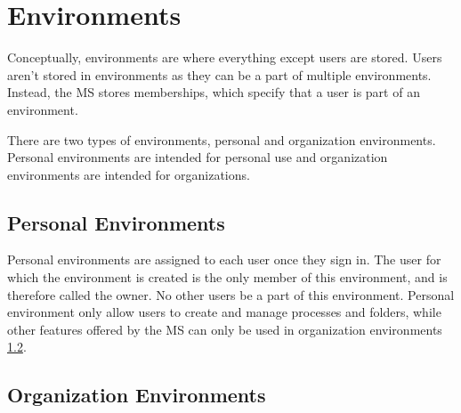 





\section{Environments}
\label{cha:conceptanddesign:environments}

Conceptually, environments are where everything except users are stored.
Users aren't stored in environments as they can be a part of multiple environments.
Instead, the MS stores memberships, which specify that a user is part of an environment.

There are two types of environments, personal and organization environments.
Personal environments are intended for personal use and organization environments are intended
for organizations.

\subsection{Personal Environments}
\label{cha:conceptanddesign:environments:personal}

Personal environments are assigned to each user once they sign in. 
The user for which the environment is created is the only member of this
environment, and is therefore called the owner.
No other users be a part of this environment.
Personal environment only allow users to create and manage processes and folders,
while other features offered by the MS can only be used in organization environments
\ref{cha:conceptanddesign:environments:organization}.

\subsection{Organization Environments}
\label{cha:conceptanddesign:environments:organization}


